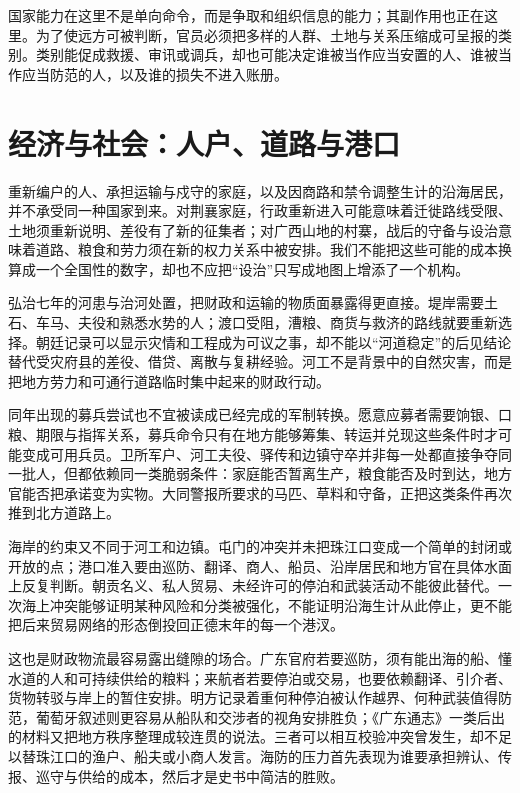 国家能力在这里不是单向命令，而是争取和组织信息的能力；其副作用也正在这里。为了使远方可被判断，官员必须把多样的人群、土地与关系压缩成可呈报的类别。类别能促成救援、审讯或调兵，却也可能决定谁被当作应当安置的人、谁被当作应当防范的人，以及谁的损失不进入账册。

\section{经济与社会：人户、道路与港口}

重新编户的人、承担运输与戍守的家庭，以及因商路和禁令调整生计的沿海居民，并不承受同一种国家到来。对荆襄家庭，行政重新进入可能意味着迁徙路线受限、土地须重新说明、差役有了新的征集者；对广西山地的村寨，战后的守备与设治意味着道路、粮食和劳力须在新的权力关系中被安排。我们不能把这些可能的成本换算成一个全国性的数字，却也不应把“设治”只写成地图上增添了一个机构。

弘治七年的河患与治河处置，把财政和运输的物质面暴露得更直接。堤岸需要土石、车马、夫役和熟悉水势的人；渡口受阻，漕粮、商货与救济的路线就要重新选择。朝廷记录可以显示灾情和工程成为可议之事，却不能以“河道稳定”的后见结论替代受灾府县的差役、借贷、离散与复耕经验。河工不是背景中的自然灾害，而是把地方劳力和可通行道路临时集中起来的财政行动。

同年出现的募兵尝试也不宜被读成已经完成的军制转换。愿意应募者需要饷银、口粮、期限与指挥关系，募兵命令只有在地方能够筹集、转运并兑现这些条件时才可能变成可用兵员。卫所军户、河工夫役、驿传和边镇守卒并非每一处都直接争夺同一批人，但都依赖同一类脆弱条件：家庭能否暂离生产，粮食能否及时到达，地方官能否把承诺变为实物。大同警报所要求的马匹、草料和守备，正把这类条件再次推到北方道路上。

海岸的约束又不同于河工和边镇。屯门的冲突并未把珠江口变成一个简单的封闭或开放的点；港口准入要由巡防、翻译、商人、船员、沿岸居民和地方官在具体水面上反复判断。朝贡名义、私人贸易、未经许可的停泊和武装活动不能彼此替代。一次海上冲突能够证明某种风险和分类被强化，不能证明沿海生计从此停止，更不能把后来贸易网络的形态倒投回正德末年的每一个港汊。

这也是财政物流最容易露出缝隙的场合。广东官府若要巡防，须有能出海的船、懂水道的人和可持续供给的粮料；来航者若要停泊或交易，也要依赖翻译、引介者、货物转驳与岸上的暂住安排。明方记录着重何种停泊被认作越界、何种武装值得防范，葡萄牙叙述则更容易从船队和交涉者的视角安排胜负；《广东通志》一类后出的材料又把地方秩序整理成较连贯的说法。三者可以相互校验冲突曾发生，却不足以替珠江口的渔户、船夫或小商人发言。海防的压力首先表现为谁要承担辨认、传报、巡守与供给的成本，然后才是史书中简洁的胜败。


